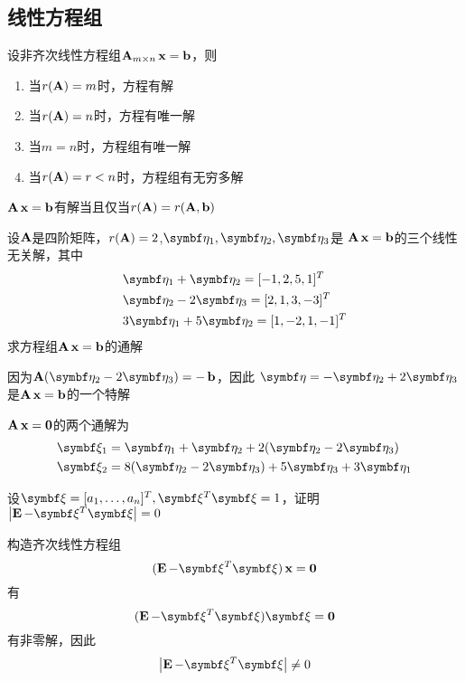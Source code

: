 \documentclass{article}
\begin{document}
\subsection{线性方程组}
\label{sec:org2893696}
\begin{examplle}[]
设非齐次线性方程组\(\operatorname{\textbf{A}}_{m\times n}\operatorname{\textbf{x}}=\operatorname{\textbf{b}}\)，则
\begin{enumerate}
\item 当\(r(\operatorname{\textbf{A}})=m\)时，方程有解
\item 当\(r(\operatorname{\textbf{A}})=n\)时，方程有唯一解
\item 当\(m=n\)时，方程组有唯一解
\item 当\(r(\operatorname{\textbf{A}})=r<n\)时，方程组有无穷多解
\end{enumerate}


\(\operatorname{\textbf{A}}\operatorname{\textbf{x}}=\operatorname{\textbf{b}}\)有解当且仅当\(r(\operatorname{\textbf{A}})=r(\operatorname{\textbf{A}},\operatorname{\textbf{b}})\)
\end{examplle}

\begin{examplle}[]
设\(\operatorname{\textbf{A}}\)是四阶矩阵，\(r(\operatorname{\textbf{A}})=2\),\(\boldeta_1,\boldeta_2,\boldeta_3\)是
\(\operatorname{\textbf{A}}\operatorname{\textbf{x}}=\operatorname{\textbf{b}}\)的三个线性无关解，其中
\begin{align*}
&\boldeta_1+\boldeta_2=[-1,2,5,1]^T\\
&\boldeta_2-2\boldeta_3=[2,1,3,-3]^T\\
&3\boldeta_1+5\boldeta_2=[1,-2,1,-1]^T
\end{align*}
求方程组\(\operatorname{\textbf{A}}\operatorname{\textbf{x}}=\operatorname{\textbf{b}}\)的通解

因为\(\bA(\boldeta_2-2\boldeta_3)=-\bb\)，因此
\(\boldeta=-\boldeta_2+2\boldeta_3\)是\(\operatorname{\textbf{A}}\operatorname{\textbf{x}}=\operatorname{\textbf{b}}\)的一个特解

\(\operatorname{\textbf{A}}\operatorname{\textbf{x}}=\mathbf{0}\)的两个通解为
\begin{align*}
&\bxi_1=\boldeta_1+\boldeta_2+2(\boldeta_2-2\boldeta_3)\\
&\bxi_2=8(\boldeta_2-2\boldeta_3)+5\boldeta_3+3\boldeta_1
\end{align*}
\end{examplle}

\begin{examplle}[]
设\(\bxi=[a_1,\dots,a_n]^T,\bxi^T\bxi=1\)，证明\(\abs{\bE-\bxi^T\bxi}=0\)

构造齐次线性方程组
\begin{equation*}
(\bE-\bxi^T\bxi)\bx=\bzero
\end{equation*}
有
\begin{equation*}
(\bE-\bxi^T\bxi)\bxi=\bzero
\end{equation*}
有非零解，因此
\begin{equation*}
\abs{\bE-\bxi^T\bxi}\neq0
\end{equation*}
\end{examplle}
\end{document}
